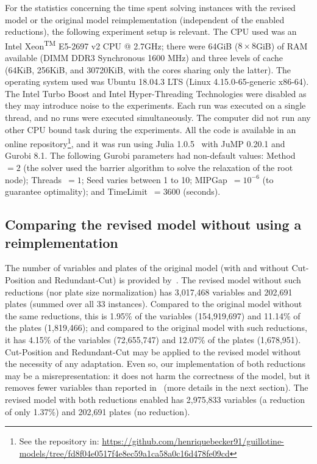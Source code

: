 \documentclass[runningheads]{llncs}
\begin{document}
For the statistics concerning the time spent solving instances with the revised model or the original model reimplementation (independent of the enabled reductions), the following experiment setup is relevant.
The CPU used was an Intel\textsuperscript{\textregistered} Xeon\textsuperscript{TM} E5-2697 v2 CPU @ 2.7GHz;
there were 64GiB (\(8 \times 8\)GiB) of RAM available (DIMM DDR3 Synchronous 1600 MHz) and three levels of cache (64KiB, 256KiB, and 30720KiB, with the cores sharing only the latter).
The operating system used was Ubuntu 18.04.3 LTS (Linux 4.15.0-65-generic x86-64).
The Intel\textsuperscript{\textregistered} Turbo Boost and Intel\textsuperscript{\textregistered} Hyper-Threading Technologies were disabled as they may introduce noise to the experiments.
Each run was executed on a single thread, and no runs were executed simultaneously.
The computer did not run any other CPU bound task during the experiments.
All the code is available in an online repository\footnote{See the repository in: \url{https://github.com/henriquebecker91/guillotine-models/tree/fd8f04e0517f4e8ec59a1ca58a0c16d478fe09cd}}, and it was run using Julia 1.0.5~\cite{julia} with JuMP 0.20.1 and Gurobi 8.1.%
The following Gurobi parameters had non-default values: Method~\(= 2\) (the solver used the barrier algorithm to solve the relaxation of the root node); Threads~\(= 1\); Seed varies between 1 to 10; MIPGap~\(= 10^{-6}\) (to guarantee optimality); and TimeLimit~\(= 3600\) (seconds).

\subsection{Comparing the revised model without using a reimplementation}

The number of variables and plates of the original model (with and without Cut-Position and Redundant-Cut) is provided by~\cite{dimitri_thesis}.
The revised model without such reductions (nor plate size normalization) has 3,017,468 variables and 202,691 plates (summed over all 33 instances). Compared to the original model without the same reductions, this is 1.95\% of the variables (154,919,697) and 11.14\% of the plates (1,819,466); and compared to the original model with such reductions, it has 4.15\% of the variables (72,655,747) and 12.07\% of the plates (1,678,951).
Cut-Position and Redundant-Cut may be applied to the revised model without the necessity of any adaptation.
Even so, our implementation of both reductions may be a misrepresentation: it does not harm the correctness of the model, but it removes fewer variables than reported in~\cite{dimitri_thesis} (more details in the next section).
The revised model with both reductions enabled has 2,975,833 variables (a reduction of only 1.37\%) and 202,691 plates (no reduction). 
\end{document}
